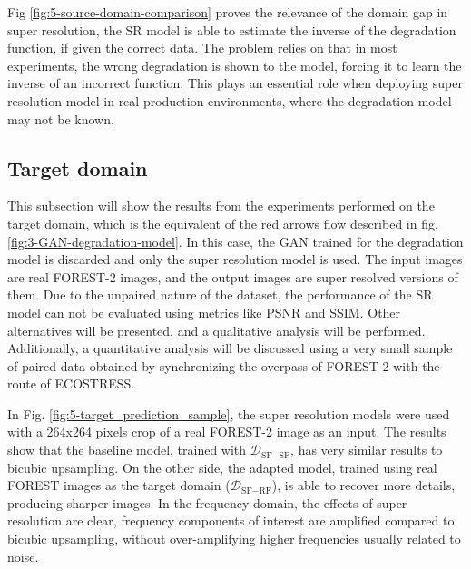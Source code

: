         Fig \ref{fig:5-source-domain-comparison} proves the relevance of the domain gap in super resolution, the SR model is able to estimate the inverse of the degradation function, if given the correct data.
        The problem relies on that in most experiments, the wrong degradation is shown to the model, forcing it to learn the inverse of an incorrect function.  
        This plays an essential role when deploying super resolution model in real production environments, where the degradation model may not be known. 

    \subsection{Target domain}

        This subsection will show the results from the experiments performed on the target domain, which is the equivalent of the red arrows flow described in fig. \ref{fig:3-GAN-degradation-model}.
        In this case, the GAN trained for the degradation model is discarded and only the super resolution model is used.
        The input images are real FOREST-2 images, and the output images are super resolved versions of them. 
        Due to the unpaired nature of the dataset, the performance of the SR model can not be evaluated using metrics like PSNR and SSIM. 
        Other alternatives will be presented, and a qualitative analysis will be performed. 
        Additionally, a quantitative analysis will be discussed using a very small sample of paired data obtained by synchronizing the overpass of FOREST-2 with the route of ECOSTRESS.


        In Fig. \ref{fig:5-target_prediction_sample}, the super resolution models were used with a 264x264 pixels crop of a real FOREST-2 image as an input.
        The results show that the baseline model, trained with $\mathcal{D}_{\text{SF}-\text{SF}}$, has very similar results to bicubic upsampling.
        On the other side, the adapted model, trained using real FOREST images as the target domain ($\mathcal{D}_{\text{SF}-\text{RF}}$), is able to recover more details, producing sharper images.
        In the frequency domain, the effects of super resolution are clear, frequency components of interest are amplified compared to bicubic upsampling, without over-amplifying higher frequencies usually related to noise.
        
        


